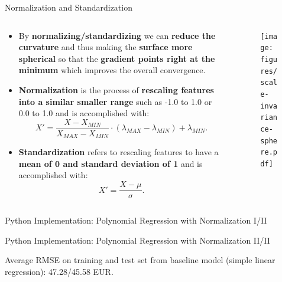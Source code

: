 \documentclass[document.tex]{subfiles}
\begin{document}
    \begin{frame}{Normalization and Standardization}
        \begin{columns}
            \begin{column}{0.6\textwidth}
                \begin{itemize}
                    \item By \textbf{normalizing/standardizing} we can \textbf{reduce the curvature} and thus making the \textbf{surface more spherical} so that the \textbf{gradient points right at the minimum} which improves the overall convergence.
                    \item \textbf{Normalization} is the process of \textbf{rescaling features into a similar smaller range} such as -1.0 to 1.0 or 0.0 to 1.0 and is accomplished with:
                    $$X' = \frac{X - X_{MIN}}{X_{MAX} - X_{MIN}} \cdot (\lambda_{MAX} - \lambda_{MIN}) + \lambda_{MIN}.$$
                    \item \textbf{Standardization} refers to rescaling features to have a \textbf{mean of 0 and standard deviation of 1} and is accomplished with:
                    $$X' = \frac{X - \mu}{\sigma}.$$
                \end{itemize}
            \end{column}
            \begin{column}{0.4\textwidth}
                \begin{figure}
                    \label{fig:scale-invariance-sphere}
                    \texttt{[image: figures/scale-invariance-sphere.pdf]}
                \end{figure}
            \end{column}
        \end{columns}
    \end{frame}

    \begin{frame}{Python Implementation: Polynomial Regression with Normalization I/II}
        
\end{frame}

    \begin{frame}{Python Implementation: Polynomial Regression with Normalization II/II}
        
        Average RMSE on training and test set from baseline model (simple linear regression): 47.28/45.58 EUR.
    \end{frame}
\end{document}
